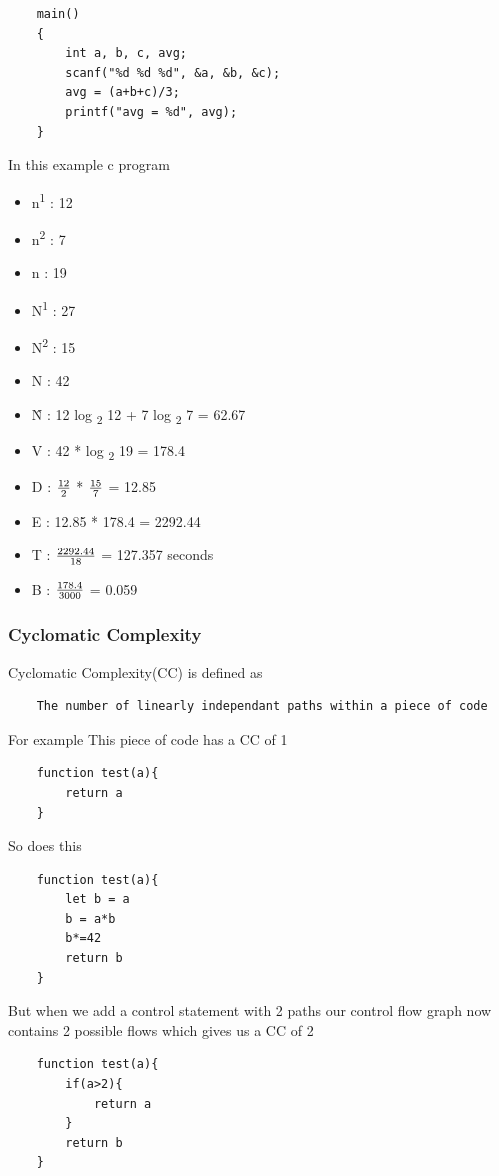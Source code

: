 \begin{verbatim}
    main()
    {
        int a, b, c, avg;
        scanf("%d %d %d", &a, &b, &c);
        avg = (a+b+c)/3;
        printf("avg = %d", avg);
    }
\end{verbatim}
In this example c program
\begin{itemize}
    \item n\textsuperscript{1} : 12
    \item n\textsuperscript{2} : 7
    \item n : 19
    \item N\textsuperscript{1} : 27
    \item N\textsuperscript{2} : 15
    \item N : 42
    \item \^{N} : 12 log \textsubscript{2} 12 + 7 log \textsubscript{2} 7 = 62.67
    \item V : 42 * log \textsubscript{2} 19 = 178.4
    \item D : $\frac{\text{12}}{\text{2}}$ * $\frac{\text{15}}{\text{7}}$ = 12.85
    \item E : 12.85 * 178.4 = 2292.44
    \item T : $\frac{\text{2292.44}}{\text{18}}$ = 127.357 seconds
    \item B : $\frac{\text{178.4}}{\text{3000}}$ = 0.059
\end{itemize}

\subsubsection{Cyclomatic Complexity}
Cyclomatic Complexity(CC) is defined as
\begin{verbatim}
    The number of linearly independant paths within a piece of code
\end{verbatim}
For example
\newline
This piece of code has a CC of 1

\begin{verbatim}
    function test(a){
        return a
    }
\end{verbatim}
So does this
\begin{verbatim}
    function test(a){
        let b = a
        b = a*b
        b*=42
        return b
    }
\end{verbatim}
But when we add a control statement with 2 paths our control flow graph now contains 2 possible flows which gives us a CC of 2
\begin{verbatim}
    function test(a){
        if(a>2){
            return a
        }
        return b
    }
\end{verbatim}


